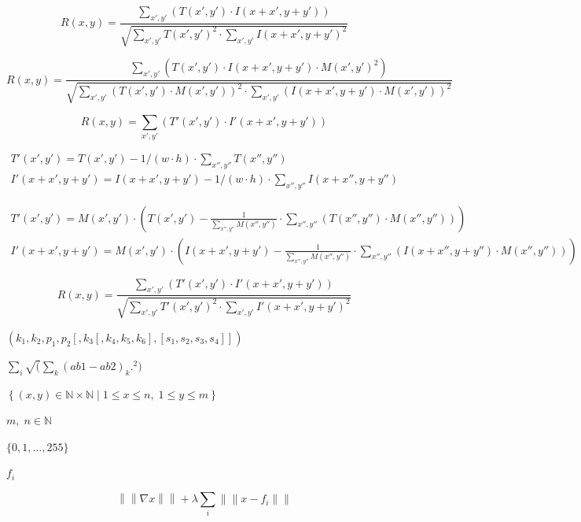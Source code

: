 \documentclass{article}
\begin{document}
\[R(x,y)= \frac{\sum_{x',y'} (T(x',y') \cdot I(x+x',y+y'))}{\sqrt{
                           \sum_{x',y'}T(x',y')^2 \cdot \sum_{x',y'} I(x+x',y+y')^2}}\]
\pagebreak

\[R(x,y)= \frac{\sum_{x',y'} (T(x',y') \cdot I(x+x',y+y') \cdot
                           M(x',y')^2)}{\sqrt{\sum_{x',y'} \left( T(x',y') \cdot M(x',y')
                           \right)^2 \cdot \sum_{x',y'} \left( I(x+x',y+y') \cdot M(x',y')
                           \right)^2}}\]
\pagebreak

\[R(x,y)= \sum _{x',y'} (T'(x',y') \cdot I'(x+x',y+y'))\]
\pagebreak

\[\begin{array}{l} T'(x',y')=T(x',y') - 1/(w \cdot h) \cdot \sum _{
                           x'',y''} T(x'',y'') \\ I'(x+x',y+y')=I(x+x',y+y') - 1/(w \cdot h)
                           \cdot \sum _{x'',y''} I(x+x'',y+y'') \end{array}\]
\pagebreak

\[\begin{array}{l} T'(x',y')=M(x',y') \cdot \left( T(x',y') -
                           \frac{1}{\sum _{x'',y''} M(x'',y'')} \cdot \sum _{x'',y''}
                           (T(x'',y'') \cdot M(x'',y'')) \right) \\ I'(x+x',y+y')=M(x',y')
                           \cdot \left( I(x+x',y+y') - \frac{1}{\sum _{x'',y''} M(x'',y'')}
                           \cdot \sum _{x'',y''} (I(x+x'',y+y'') \cdot M(x'',y'')) \right)
                           \end{array} \]
\pagebreak

\[R(x,y)= \frac{ \sum_{x',y'} (T'(x',y') \cdot I'(x+x',y+y')) }{
                           \sqrt{\sum_{x',y'}T'(x',y')^2 \cdot \sum_{x',y'} I'(x+x',y+y')^2}
                           }\]
\pagebreak

$(k_1, k_2, p_1, p_2[, k_3[, k_4, k_5, k_6],[s_1, s_2, s_3, s_4]])$
\pagebreak

$ \sum_i \sqrt (\sum_k (ab1-ab2)_k.^2) $
\pagebreak

$\left\{(x,y)\in\mathbb{N}\times\mathbb{N}\mid 1\leq x\leq n,\;1\leq y\leq m\right\}$
\pagebreak

$m,\;n\in\mathbb{N}$
\pagebreak

$\{0,1,\dots,255\}$
\pagebreak

$f_i$
\pagebreak

\[\left\|\left\|\nabla x\right\|\right\| + \lambda\sum_i\left\|\left\|x-f_i\right\|\right\|\]
\pagebreak
\end{document}
